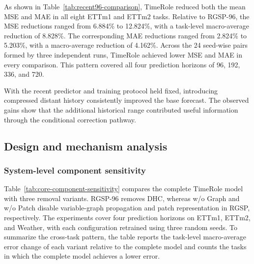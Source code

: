 As shown in Table~\ref{tab:recent96-comparison}, TimeRole reduced both the mean MSE and MAE in all eight ETTm1 and ETTm2 tasks. Relative to RGSP-96, the MSE reductions ranged from 6.884\% to 12.824\%, with a task-level macro-average reduction of 8.828\%. The corresponding MAE reductions ranged from 2.824\% to 5.203\%, with a macro-average reduction of 4.162\%. Across the 24 seed-wise pairs formed by three independent runs, TimeRole achieved lower MSE and MAE in every comparison. This pattern covered all four prediction horizons of 96, 192, 336, and 720.

With the recent predictor and training protocol held fixed, introducing compressed distant history consistently improved the base forecast. The observed gains show that the additional historical range contributed useful information through the conditional correction pathway.

\subsection{Design and mechanism analysis}

\subsubsection{System-level component sensitivity}

Table~\ref{tab:core-component-sensitivity} compares the complete TimeRole model with three removal variants. RGSP-96 removes DHC, whereas w/o Graph and w/o Patch disable variable-graph propagation and patch representation in RGSP, respectively. The experiments cover four prediction horizons on ETTm1, ETTm2, and Weather, with each configuration retrained using three random seeds. To summarize the cross-task pattern, the table reports the task-level macro-average error change of each variant relative to the complete model and counts the tasks in which the complete model achieves a lower error.

